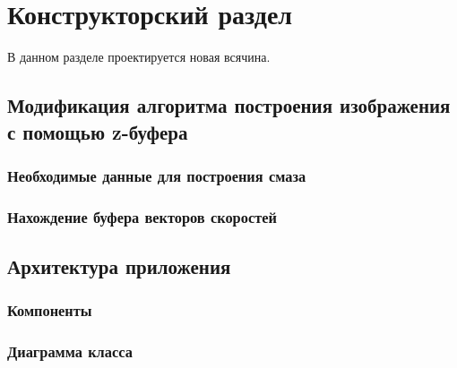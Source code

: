 \chapter{Конструкторский раздел}
\label{cha:design}

В данном разделе проектируется новая всячина.

\section{Модификация алгоритма построения изображения с помощью z-буфера}

\subsection{Необходимые данные для построения смаза}
\subsection{Нахождение буфера векторов скоростей}


\section{Архитектура приложения}

\subsection{Компоненты}
\subsection{Диаграмма класса}




